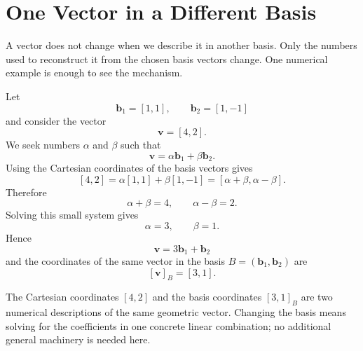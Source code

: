 \section{One Vector in a Different Basis}

A vector does not change when we describe it in another basis. Only the numbers
used to reconstruct it from the chosen basis vectors change. One numerical
example is enough to see the mechanism.

Let
\[
\mathbf b_1=[1,1],
\qquad
\mathbf b_2=[1,-1]
\]
and consider the vector
\[
\mathbf v=[4,2].
\]
We seek numbers $\alpha$ and $\beta$ such that
\[
\mathbf v=\alpha\mathbf b_1+\beta\mathbf b_2.
\]
Using the Cartesian coordinates of the basis vectors gives
\[
[4,2]
=
\alpha[1,1]+\beta[1,-1]
=
[\alpha+\beta,\alpha-\beta].
\]
Therefore
\[
\alpha+\beta=4,
\qquad
\alpha-\beta=2.
\]
Solving this small system gives
\[
\alpha=3,
\qquad
\beta=1.
\]
Hence
\[
\boxed{
\mathbf v=3\mathbf b_1+\mathbf b_2
}
\]
and the coordinates of the same vector in the basis
$B=(\mathbf b_1,\mathbf b_2)$ are
\[
\boxed{
[\mathbf v]_B=[3,1].
}
\]

\begin{center}
\end{center}

The Cartesian coordinates $[4,2]$ and the basis coordinates $[3,1]_B$ are two
numerical descriptions of the same geometric vector. Changing the basis means
solving for the coefficients in one concrete linear combination; no additional
general machinery is needed here.
